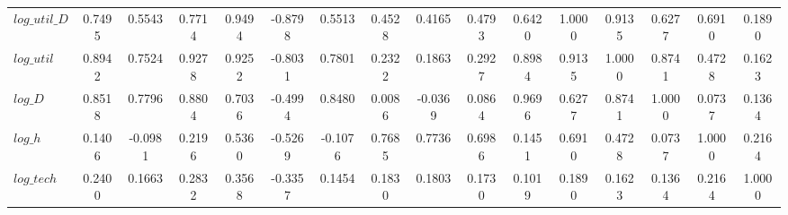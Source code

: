 \begin{center}
\begin{longtable}{lccccccccccccccc}
$log\_util\_D   $	 & 	           0.7495	 & 	           0.5543	 & 	           0.7714	 & 	           0.9494	 & 	          -0.8798	 & 	           0.5513	 & 	           0.4528	 & 	           0.4165	 & 	           0.4793	 & 	           0.6420	 & 	           1.0000	 & 	           0.9135	 & 	           0.6277	 & 	           0.6910	 & 	           0.1890 \\ 
$log\_util      $	 & 	           0.8942	 & 	           0.7524	 & 	           0.9278	 & 	           0.9252	 & 	          -0.8031	 & 	           0.7801	 & 	           0.2322	 & 	           0.1863	 & 	           0.2927	 & 	           0.8984	 & 	           0.9135	 & 	           1.0000	 & 	           0.8741	 & 	           0.4728	 & 	           0.1623 \\ 
$log\_D         $	 & 	           0.8518	 & 	           0.7796	 & 	           0.8804	 & 	           0.7036	 & 	          -0.4994	 & 	           0.8480	 & 	           0.0086	 & 	          -0.0369	 & 	           0.0864	 & 	           0.9696	 & 	           0.6277	 & 	           0.8741	 & 	           1.0000	 & 	           0.0737	 & 	           0.1364 \\ 
$log\_h         $	 & 	           0.1406	 & 	          -0.0981	 & 	           0.2196	 & 	           0.5360	 & 	          -0.5269	 & 	          -0.1076	 & 	           0.7685	 & 	           0.7736	 & 	           0.6986	 & 	           0.1451	 & 	           0.6910	 & 	           0.4728	 & 	           0.0737	 & 	           1.0000	 & 	           0.2164 \\ 
$log\_tech      $	 & 	           0.2400	 & 	           0.1663	 & 	           0.2832	 & 	           0.3568	 & 	          -0.3357	 & 	           0.1454	 & 	           0.1830	 & 	           0.1803	 & 	           0.1730	 & 	           0.1019	 & 	           0.1890	 & 	           0.1623	 & 	           0.1364	 & 	           0.2164	 & 	           1.0000 \\ 
\end{longtable}
 \end{center}
